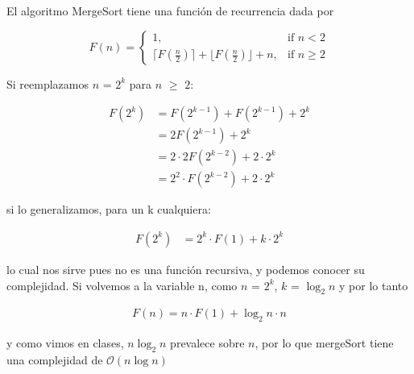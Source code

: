 El algoritmo MergeSort tiene una función de recurrencia dada por 

\[
   F(n) = 
 \begin{cases}
     1,              & \text{if } n < 2\\
    \lceil F(\frac{n}{2}) \rceil + \lfloor F(\frac{n}{2}) \rfloor + n, & \text{if } n \geq 2
 
\end{cases}
\]

Si reemplazamos $n$ = $2^k$ para $n$ $\geq$ $2$:


\begin{align}
    F(2^k) &= F(2^{k-1}) + F(2^{k-1}) + 2^k\\
           &= 2F(2^{k-1}) + 2^k\\
           &= 2 \cdot 2F(2^{k-2}) + 2 \cdot 2^k\\
           &= 2^2 \cdot F(2^{k-2}) + 2 \cdot 2^k
\end{align}

si lo generalizamos, para un k cualquiera:

\begin{align}
    F(2^k) &= 2^k \cdot F(1) + k \cdot 2^k
\end{align}

lo cual nos sirve pues no es una función recursiva, y podemos conocer su complejidad. Si volvemos a la variable n, como $n$ = $2^k$, $k$ = $\log_2 {n}$ y por lo tanto

\begin{align}
    F(n) = n \cdot F(1) + \log_2 n \cdot n
\end{align}

y como vimos en clases, $n\log_2 n$ prevalece sobre $n$, por lo que mergeSort tiene una complejidad de $\mathcal{O}(n\log{}n)$